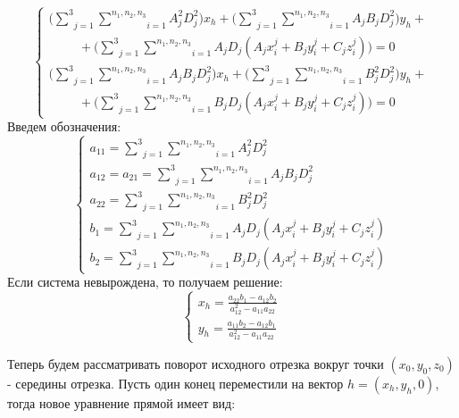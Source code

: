 $$\begin{cases}
	\Bigg( \underset{j=1}{\overset{3}{\sum}}\underset{i=1}{\overset{n_1, n_2, n_3}{\sum}} A_j^2 D_j^2 \Bigg) x_h + \Bigg( \underset{j=1}{\overset{3}{\sum}}\underset{i=1}{\overset{n_1, n_2, n_3}{\sum}} A_j B_j D_j^2 \Bigg) y_h + \\
	\hspace{1cm} + \Bigg( \underset{j=1}{\overset{3}{\sum}}\underset{i=1}{\overset{n_1, n_2, n_3}{\sum}} A_j D_j \left(  A_j x_i^j + B_j y_i^j + C_j z_i^j\right) \Bigg) = 0 \\
	\Bigg( \underset{j=1}{\overset{3}{\sum}}\underset{i=1}{\overset{n_1, n_2, n_3}{\sum}} A_j B_j D_j^2 \Bigg) x_h + \Bigg( \underset{j=1}{\overset{3}{\sum}}\underset{i=1}{\overset{n_1, n_2, n_3}{\sum}} B_j^2 D_j^2 \Bigg) y_h + \\
	\hspace{1cm} + \Bigg( \underset{j=1}{\overset{3}{\sum}}\underset{i=1}{\overset{n_1, n_2, n_3}{\sum}} B_j D_j \left( A_j x_i^j + B_j y_i^j + C_j z_i^j \right) \Bigg) = 0
\end{cases}$$
Введем обозначения:
$$\begin{cases}
	a_{11} = \underset{j=1}{\overset{3}{\sum}}\underset{i=1}{\overset{n_1, n_2, n_3}{\sum}} A_j^2 D_j^2 \\
	a_{12} = a_{21} = \underset{j=1}{\overset{3}{\sum}}\underset{i=1}{\overset{n_1, n_2, n_3}{\sum}} A_j B_j D_j^2 \\
	a_{22} = \underset{j=1}{\overset{3}{\sum}}\underset{i=1}{\overset{n_1, n_2, n_3}{\sum}} B_j^2 D_j^2 \\
	b_1 = \underset{j=1}{\overset{3}{\sum}}\underset{i=1}{\overset{n_1, n_2, n_3}{\sum}} A_j D_j \left(  A_j x_i^j + B_j y_i^j + C_j z_i^j\right) \\
	b_2 = \underset{j=1}{\overset{3}{\sum}}\underset{i=1}{\overset{n_1, n_2, n_3}{\sum}} B_j D_j \left( A_j x_i^j + B_j y_i^j + C_j z_i^j \right)
\end{cases}$$
Если система невырождена, то получаем решение:
$$\begin{cases}
	x_h = \frac{a_{22} b_1 - a_{12} b_2}{a_{12}^2 - a_{11}a_{22}} \\
	y_h = \frac{a_{11} b_2 - a_{12} b_1}{a_{12}^2 - a_{11}a_{22}}
\end{cases}$$

\vspace{0.5cm}
Теперь будем рассматривать поворот исходного отрезка вокруг точки $(x_0, y_0, z_0)$ - середины отрезка. Пусть один конец переместили на вектор $h = (x_h, y_h, 0)$, тогда новое уравнение прямой имеет вид:

